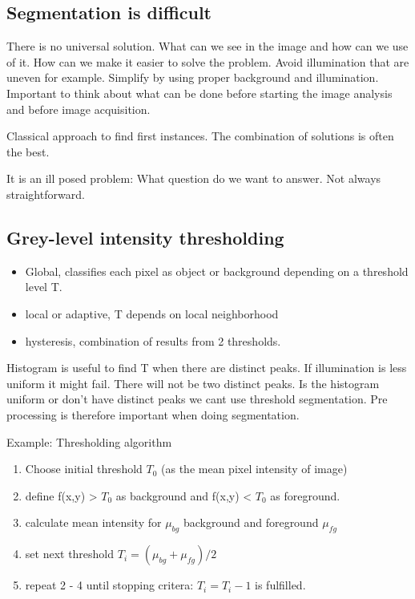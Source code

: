\subsection*{Segmentation is difficult}
There is no universal solution. What can we see in the image and how can we use of it. How can we make it easier to solve the problem. Avoid illumination that are uneven for example. Simplify by using proper background and illumination. Important to think about what can be done before starting the image analysis and before image acquisition.  

Classical approach to find first instances. The combination of solutions is often the best. 

It is an ill posed problem: What question do we want to answer. Not always straightforward. 

\subsection*{Grey-level intensity thresholding}

\begin{itemize}
	\item Global, classifies each pixel as object or background depending on a threshold level T.
	\item local or adaptive, T depends on local neighborhood
	\item hysteresis, combination of results from 2 thresholds. 
\end{itemize}


Histogram is useful to find T when there are distinct peaks. If illumination is less uniform it might fail. There will not be two distinct peaks. Is the histogram uniform or don't have distinct peaks we cant use threshold segmentation. Pre processing is therefore important when doing segmentation. 

\begin{example}{Example: Thresholding algorithm}
\begin{enumerate}
	\item Choose initial threshold $T_0$ (as the mean pixel intensity of image)
	\item define f(x,y) > $T_0$ as background and f(x,y) < $T_0$ as foreground.
	\item calculate mean intensity for $\mu_{bg}$ background and foreground $\mu_{fg}$
	\item set next threshold $T_i = (\mu_{bg}+\mu_{fg})/2$
	\item  repeat 2 - 4 until stopping critera: $T_i = T_i -1$ is fulfilled.
\end{enumerate}

\end{example}	

